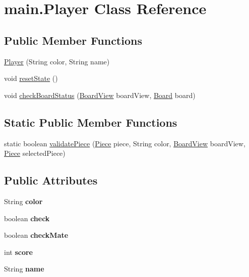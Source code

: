 \hypertarget{classmain_1_1_player}{}\section{main.\+Player Class Reference}
\label{classmain_1_1_player}
\subsection*{Public Member Functions}
\begin{DoxyCompactItemize}
\item 
\hyperlink{classmain_1_1_player_a7a07b12fa4f52134a9b68abf32b0cb65}{Player} (String color, String name)
\item 
void \hyperlink{classmain_1_1_player_a0ab2e50adb7dd825ae62268459dfb633}{reset\+State} ()
\item 
void \hyperlink{classmain_1_1_player_a20e4d2604d95857e73ba9ce628b2037b}{check\+Board\+Status} (\hyperlink{classmain_1_1_board_view}{Board\+View} board\+View, \hyperlink{classmain_1_1model_1_1_board}{Board} board)
\end{DoxyCompactItemize}
\subsection*{Static Public Member Functions}
\begin{DoxyCompactItemize}
\item 
static boolean \hyperlink{classmain_1_1_player_a154e7eebeeab65000f917c736f6cb822}{validate\+Piece} (\hyperlink{classmain_1_1pieces_1_1_piece}{Piece} piece, String color, \hyperlink{classmain_1_1_board_view}{Board\+View} board\+View, \hyperlink{classmain_1_1pieces_1_1_piece}{Piece} selected\+Piece)
\end{DoxyCompactItemize}
\subsection*{Public Attributes}
\begin{DoxyCompactItemize}
\item 
\hypertarget{classmain_1_1_player_a676bda6b0543e4e4093955835f1829da}{}\label{classmain_1_1_player_a676bda6b0543e4e4093955835f1829da} 
String {\bfseries color}
\item 
\hypertarget{classmain_1_1_player_a3214a3ccfb412f6418cb30629efbdba8}{}\label{classmain_1_1_player_a3214a3ccfb412f6418cb30629efbdba8} 
boolean {\bfseries check}
\item 
\hypertarget{classmain_1_1_player_a37183b7b9911bca48917a4d560fb5a08}{}\label{classmain_1_1_player_a37183b7b9911bca48917a4d560fb5a08} 
boolean {\bfseries check\+Mate}
\item 
\hypertarget{classmain_1_1_player_a789e767891852d4225dd3374d8c1507d}{}\label{classmain_1_1_player_a789e767891852d4225dd3374d8c1507d} 
int {\bfseries score}
\item 
\hypertarget{classmain_1_1_player_a52da3f9931858dcde58a377923e98073}{}\label{classmain_1_1_player_a52da3f9931858dcde58a377923e98073} 
String {\bfseries name}
\end{DoxyCompactItemize}


